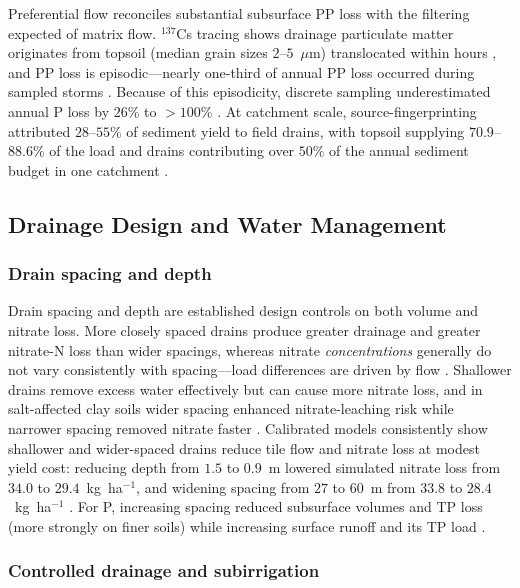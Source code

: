 \documentclass[11pt]{article}
\begin{document}
Preferential flow reconciles substantial subsurface PP loss with the
filtering expected of matrix flow. $^{137}$Cs tracing shows drainage
particulate matter originates from topsoil (median grain sizes $2$--$5$~$\mu$m)
translocated within hours \parencite{Laubel1999,Uusitalo2001}, and PP loss is
episodic---nearly one-third of annual PP loss occurred during sampled storms
\parencite{Laubel1999,Grant1996}. Because of this episodicity, discrete
sampling underestimated annual P loss by $26\%$ to $>100\%$
\parencite{Grant1996}. At catchment scale, source-fingerprinting attributed
$28$--$55\%$ of sediment yield to field drains, with topsoil supplying
$70.9$--$88.6\%$ of the load and drains contributing over $50\%$ of the annual
sediment budget in one catchment \parencite{Walling2002,Chapman2005}.

\subsection{Drainage Design and Water Management}

\subsubsection{Drain spacing and depth}

Drain spacing and depth are established design controls on both volume and
nitrate loss. More closely spaced drains produce greater drainage and greater
nitrate-N loss than wider spacings, whereas nitrate \emph{concentrations}
generally do not vary consistently with spacing---load differences are driven
by flow \parencite{Kladivko2021,Kladivko2004}. Shallower drains remove excess
water effectively but can cause more nitrate loss, and in salt-affected clay
soils wider spacing enhanced nitrate-leaching risk while narrower spacing
removed nitrate faster \parencite{Hashemi2020,Singh2002,Singh2001c,Singh2007}.
Calibrated models consistently show shallower and wider-spaced drains reduce
tile flow and nitrate loss at modest yield cost: reducing depth from $1.5$ to
$0.9$~m lowered simulated nitrate loss from $34.0$ to $29.4$~kg~ha$^{-1}$, and
widening spacing from $27$ to $60$~m from $33.8$ to $28.4$~kg~ha$^{-1}$
\parencite{Moriasi2013,Nangia2010c,Davis2000,Hwang2024}. For P, increasing
spacing reduced subsurface volumes and TP loss (more strongly on finer soils)
while increasing surface runoff and its TP load \parencite{Morrison2013}.

\subsubsection{Controlled drainage and subirrigation}
\end{document}
